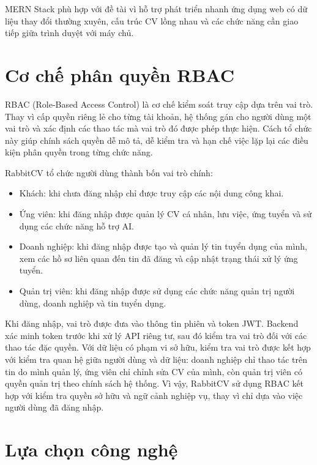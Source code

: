MERN Stack phù hợp với đề tài vì hỗ trợ phát triển nhanh ứng dụng web có dữ liệu thay đổi thường xuyên, cấu trúc CV lồng nhau và các chức năng cần giao tiếp giữa trình duyệt với máy chủ.

\clearpage

\section{Cơ chế phân quyền RBAC}

RBAC (Role-Based Access Control) là cơ chế kiểm soát truy cập dựa trên vai trò. Thay vì cấp quyền riêng lẻ cho từng tài khoản, hệ thống gán cho người dùng một vai trò và xác định các thao tác mà vai trò đó được phép thực hiện. Cách tổ chức này giúp chính sách quyền dễ mô tả, dễ kiểm tra và hạn chế việc lặp lại các điều kiện phân quyền trong từng chức năng.

RabbitCV tổ chức người dùng thành bốn vai trò chính:

\begin{itemize}
    \item Khách: khi chưa đăng nhập chỉ được truy cập các nội dung công khai.
    \item Ứng viên: khi đăng nhập được quản lý CV cá nhân, lưu việc, ứng tuyển và sử dụng các chức năng hỗ trợ AI.
    \item Doanh nghiệp: khi đăng nhập được tạo và quản lý tin tuyển dụng của mình, xem các hồ sơ liên quan đến tin đã đăng và cập nhật trạng thái xử lý ứng tuyển.
    \item Quản trị viên: khi đăng nhập được sử dụng các chức năng quản trị người dùng, doanh nghiệp và tin tuyển dụng.
\end{itemize}

Khi đăng nhập, vai trò được đưa vào thông tin phiên và token JWT. Backend xác minh token trước khi xử lý API riêng tư, sau đó kiểm tra vai trò đối với các thao tác đặc quyền. Với dữ liệu có phạm vi sở hữu, kiểm tra vai trò được kết hợp với kiểm tra quan hệ giữa người dùng và dữ liệu: doanh nghiệp chỉ thao tác trên tin do mình quản lý, ứng viên chỉ chỉnh sửa CV của mình, còn quản trị viên có quyền quản trị theo chính sách hệ thống. Vì vậy, RabbitCV sử dụng RBAC kết hợp với kiểm tra quyền sở hữu và ngữ cảnh nghiệp vụ, thay vì chỉ dựa vào việc người dùng đã đăng nhập.

\section{Lựa chọn công nghệ}

